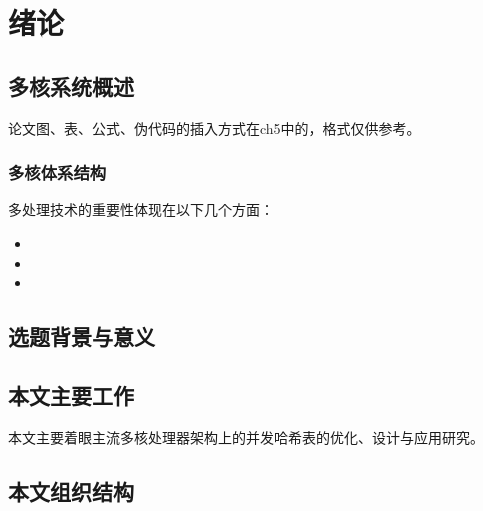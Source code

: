 \chapter{绪\quad 论}

\section{多核系统概述}
论文图、表、公式、伪代码的插入方式在ch5中的，格式仅供参考。
\subsection{多核体系结构}
多处理技术的重要性体现在以下几个方面：
\begin{itemize}
	\item 
	\item 
	\item
\end{itemize}

\section{选题背景与意义}

\section{本文主要工作}
本文主要着眼主流多核处理器架构上的并发哈希表的优化、设计与应用研究。

\section{本文组织结构}

